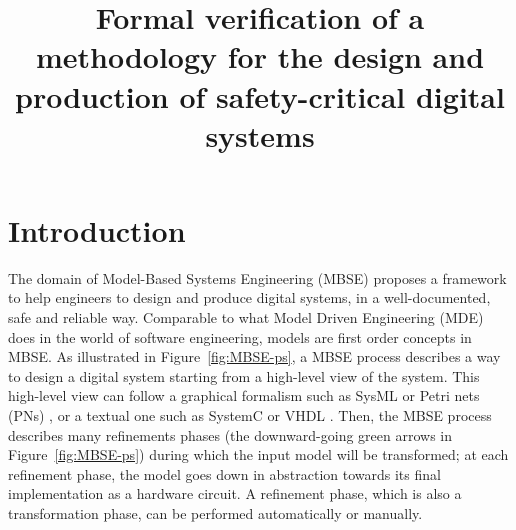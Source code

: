 \documentclass[pdflatex,sn-mathphys]{sn-jnl}%
\theoremstyle{thmstyleone}%
\theoremstyle{thmstyletwo}%
\theoremstyle{thmstylethree}%
\begin{document}
\title[Formal verification of the \hilecop{} methodology]{Formal verification of a methodology for the design and
  production of safety-critical digital systems}


\author*[1]{ }
\author[1]{ }
\author[1,2]{ }




\abstract{}

\keywords{}

\maketitle

\listoftodos

\section{Introduction}
\label{sec:intro}

The domain of Model-Based Systems Engineering (MBSE) \cite{Long2011}
proposes a framework to help engineers to design and produce digital
systems, in a well-documented, safe and reliable way. Comparable to
what Model Driven Engineering (MDE) does in the world of software
engineering, models are first order concepts in MBSE.  As illustrated
in Figure~\ref{fig:MBSE-ps}, a MBSE process describes a way to design
a digital system starting from a high-level view of the system. This
high-level view can follow a graphical formalism such as SysML
\cite{Friedenthal2014} or Petri nets (PNs) \cite{Petri1962}, or a
textual one such as SystemC \cite{Black2009} or VHDL
\cite{Ashenden2010}. Then, the MBSE process describes many refinements
phases (the downward-going green arrows in Figure~\ref{fig:MBSE-ps})
during which the input model will be transformed; at each refinement
phase, the model goes down in abstraction towards its final
implementation as a hardware circuit. A refinement phase, which is
also a transformation phase, can be performed automatically or
manually.
\end{document}
